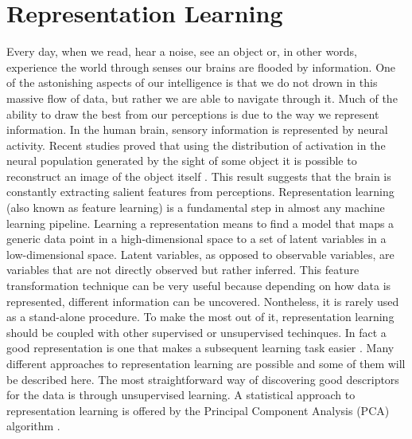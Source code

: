 \section{Representation Learning}
Every day, when we read, hear a noise, see an object or, in other words, experience the world through senses our brains are flooded by information. One of the astonishing aspects of our intelligence is that we do not drown in this massive flow of data, but rather we are able to navigate through it. Much of the ability to draw the best from our perceptions is due to the way we represent information. In the human brain, sensory information is represented by neural activity. Recent studies proved that using the distribution of activation in the neural population generated by the sight of some object it is possible to reconstruct an image of the object itself \cite{shen2019deep}. This result suggests that the brain is constantly extracting salient features from perceptions.
\bigbreak
\noindent Representation learning (also known as feature learning) is a fundamental step in almost any machine learning pipeline. Learning a representation means to find a model that maps a generic data point in a high-dimensional space to a set of latent variables in a low-dimensional space. Latent variables, as opposed to observable variables, are variables that are not directly observed but rather inferred. This feature transformation technique can be very useful because depending on how data is represented, different information can be uncovered. Nontheless, it is rarely used as a stand-alone procedure. To make the most out of it, representation learning should be coupled with other supervised or unsupervised techinques. In fact a good representation is one that makes a subsequent learning task easier \cite[Chapter~15]{goodfellow2016deep}. %
\bigbreak
\noindent Many different approaches to representation learning are possible and some of them will be described here. The most straightforward way of discovering good descriptors for the data is through unsupervised learning. A statistical approach to representation learning is offered by the Principal Component Analysis (PCA) algorithm \cite{jolliffe2011principal}.
\bigbreak
